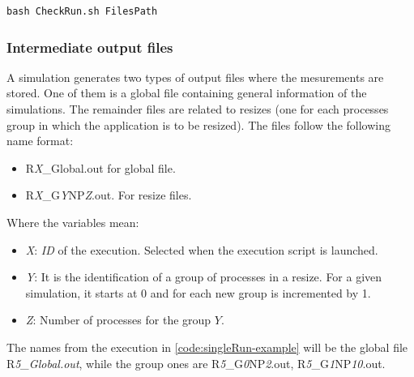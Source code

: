\begin{lstlisting}[float,caption=Script \textit{CheckRun.sh} example of use., label=code:Checkrun, captionpos=b]
    bash CheckRun.sh FilesPath
\end{lstlisting}



\subsubsection{Intermediate output files}
\label{subsection:intermediate_files}
A simulation %
generates two types of output files where the mesurements are stored. One of them is a global file containing general information of the simulations. The remainder files are related to resizes (one for each processes group in which the application is to be resized). The files follow the following name format: %
\begin{itemize}
    \item R\textit{X}\_Global.out for global file. 
    \item R\textit{X}\_G\textit{Y}NP\textit{Z}.out. For resize files.
\end{itemize}

Where the variables mean:
\begin{itemize}
    \item \textit{X}: \textit{ID} of the execution. Selected when the execution script is launched.
    \item \textit{Y}: It is the identification of a group of processes in a resize. For a given simulation, it  starts at 0 and for each new group is incremented by 1.
    \item \textit{Z}: Number of processes for the group $Y$.
\end{itemize}

The names from the execution in \ref{code:singleRun-example} will be the global file R\textit{5\_Global.out}, while the group ones are R\textit{5}\_G\textit{0}NP\textit{2}.out, R\textit{5}\_G\textit{1}NP\textit{10}.out.

